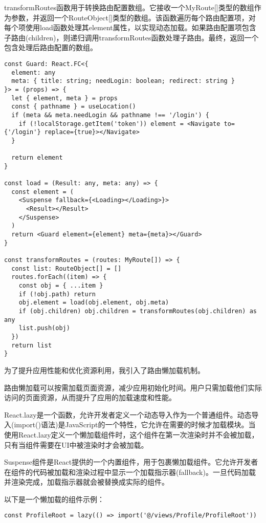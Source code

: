 \documentclass[12pt,a4paper]{article}
\begin{document}
\begin{CJK*}{UTF8}{gbsn}
transformRoutes函数用于转换路由配置数组。它接收一个MyRoute[]类型的数组作为参数，并返回一个RouteObject[]类型的数组。该函数遍历每个路由配置项，对每个项使用load函数处理其element属性，以实现动态加载。如果路由配置项包含子路由(children)，则递归调用transformRoutes函数处理子路由。最终，返回一个包含处理后路由配置的数组。
\begin{mdframed}
\begin{verbatim}
const Guard: React.FC<{
  element: any
  meta: { title: string; needLogin: boolean; redirect: string }
}> = (props) => {
  let { element, meta } = props
  const { pathname } = useLocation()
  if (meta && meta.needLogin && pathname !== '/login') {
    if (!localStorage.getItem('token')) element = <Navigate to={'/login'} replace={true}></Navigate>
  }

  return element
}

const load = (Result: any, meta: any) => {
  const element = (
    <Suspense fallback={<Loading></Loading>}>
      <Result></Result>
    </Suspense>
  )
  return <Guard element={element} meta={meta}></Guard>
}

const transformRoutes = (routes: MyRoute[]) => {
  const list: RouteObject[] = []
  routes.forEach((item) => {
    const obj = { ...item }
    if (!obj.path) return
    obj.element = load(obj.element, obj.meta)
    if (obj.children) obj.children = transformRoutes(obj.children) as any
    list.push(obj)
  })
  return list
}
\end{verbatim} 
\end{mdframed}


为了提升应用性能和优化资源利用，我引入了路由懒加载机制。

路由懒加载可以按需加载页面资源，减少应用初始化时间。用户只需加载他们实际访问的页面资源，从而提升了应用的加载速度和性能。

React.lazy是一个函数，允许开发者定义一个动态导入作为一个普通组件。动态导入(import()语法)是JavaScript的一个特性，它允许在需要的时候才加载模块。当使用React.lazy定义一个懒加载组件时，这个组件在第一次渲染时并不会被加载，只有当组件需要在UI中被渲染时才会被加载。

Suspense组件是React提供的一个内置组件，用于包裹懒加载组件。它允许开发者在组件的代码被加载和渲染过程中显示一个加载指示器(fallback)。一旦代码加载并渲染完成，加载指示器就会被替换成实际的组件。

以下是一个懒加载的组件示例：
\begin{mdframed}
\begin{verbatim}
const ProfileRoot = lazy(() => import('@/views/Profile/ProfileRoot'))


\end{verbatim}
\end{mdframed}
\end{CJK*}
\end{document}
